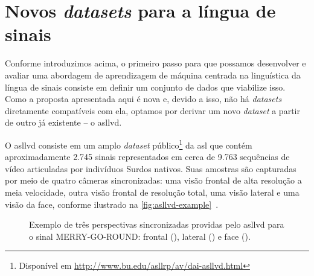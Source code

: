 \section{Novos \textit{datasets} para a língua de sinais}
\label{sec:metodologia-datasets}

Conforme introduzimos acima, o primeiro passo para que possamos desenvolver e avaliar uma abordagem de aprendizagem de máquina centrada na linguística da língua de sinais consiste em definir um conjunto de dados que viabilize isso. Como a proposta apresentada aqui é nova e, devido a isso, não há \textit{datasets} diretamente compatíveis com ela, optamos por derivar um novo \textit{dataset} a partir de outro já existente -- o \acrfull{asllvd}.

O \acrshort{asllvd} consiste em um amplo \textit{dataset} público\footnote{Disponível em \url{http://www.bu.edu/asllrp/av/dai-asllvd.html}} da \acrshort{asl} que contém aproximadamente 2.745 sinais representados em cerca de 9.763 sequências de vídeo articuladas por indivíduos Surdos nativos. Suas amostras são capturadas por meio de quatro câmeras sincronizadas: uma visão frontal de alta resolução a meia velocidade, outra visão frontal de resolução total, uma visão lateral e uma visão da face, conforme ilustrado na \autoref{fig:asllvd-example}~\cite{athitsos-2008-asllvd,neidle-2012-asllvd}.

\begin{figure}[ht!]
    \centering
    \caption{\textmd{Exemplo de três perspectivas sincronizadas providas pelo \acrshort{asllvd} para o sinal MERRY-GO-ROUND: 
    frontal (), 
    lateral () e 
    face ().}}
    \label{fig:asllvd-example}
\end{figure}


